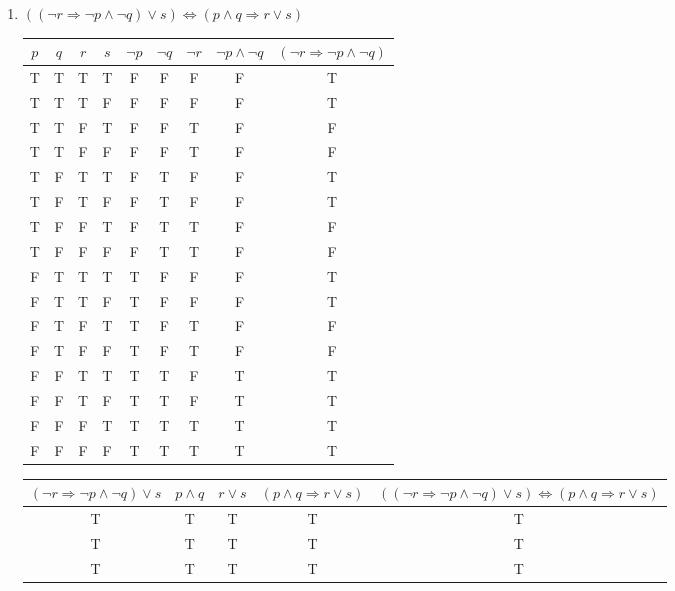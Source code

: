 \documentclass{article}
\begin{document}
\begin{enumerate}
\begin{enumerate}
			\item $((\neg r \Rightarrow \neg p \wedge \neg q) \vee s) \Leftrightarrow (p \wedge q \Rightarrow r \vee s)$
			
				\begin{tabular}{|c|c|c|c|c|c|c|c|c|}
					\hline
					$p$ & $q$ & $r$ & $s$ & $\neg p$ & $\neg q$ & $\neg r$ & $\neg p \wedge \neg q$ &
					$(\neg r \Rightarrow \neg p \wedge \neg q)$\\
					\hline
					T & T & T & T & F & F & F & F & T\\
					\hline
					T & T & T  & F & F & F & F & F & T\\
					\hline
					T & T & F & T & F & F & T & F & F\\
					\hline
					T & T & F & F & F & F & T & F & F\\
					\hline
					T & F & T & T & F & T & F & F & T\\
					\hline
					T & F & T & F & F & T  & F & F & T\\
					\hline
					T & F & F & T & F & T & T & F & F\\
					\hline
					T & F & F & F & F & T & T & F & F\\
					\hline
					F & T & T & T & T & F & F & F & T\\
					\hline
					F & T & T & F & T & F & F & F & T\\
					\hline
					F & T & F & T & T & F & T & F & F\\
					\hline
					F & T & F & F & T & F & T & F & F\\
					\hline 
					F & F & T & T & T & T & F & T & T\\
					\hline
					F & F & T & F & T & T & F & T & T\\
					\hline
					F & F & F & T & T & T & T & T & T\\
					\hline
					F & F & F & F & T & T & T & T & T\\
					\hline
				\end{tabular}
				{
				\centering
				\begin{tabular}{|c|c|c|c|c|}
					\hline
					$(\neg r \Rightarrow \neg p \wedge \neg q) \vee s$ & $p \wedge q$ & $r \vee s$ &
					$ (p \wedge q \Rightarrow r \vee s)$ 
					& $((\neg r \Rightarrow \neg p \wedge \neg q) \vee s) \Leftrightarrow (p \wedge q \Rightarrow r \vee s)$\\
					\hline
					T & T & T & T & T\\
					\hline
					T  & T & T & T & T\\
					\hline
					T & T & T & T & T\\

\end{tabular}}
\end{enumerate}
\end{enumerate}
\end{document}
